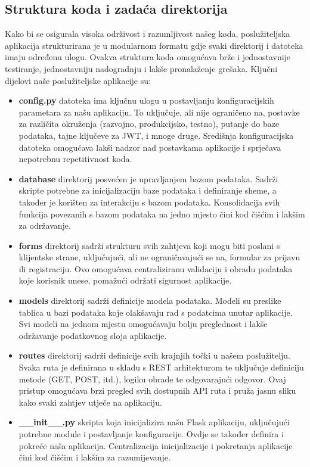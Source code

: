 \documentclass[times, utf8, zavrsni]{fer}
\begin{document}
\subsection{Struktura koda i zadaća direktorija}

Kako bi se osigurala visoka održivost i razumljivost našeg koda, poslužiteljska aplikacija strukturirana je u modularnom formatu gdje svaki direktorij i datoteka imaju određenu ulogu. Ovakva struktura koda omogućava brže i jednostavnije testiranje, jednostavniju nadogradnju i lakše pronalaženje grešaka. 
Ključni dijelovi naše poslužiteljske aplikacije su:

\begin{itemize}

\item \textbf{config.py} datoteka ima ključnu ulogu u postavljanju konfiguracijskih parametara za našu aplikaciju. To uključuje, ali nije ograničeno na, postavke za različita okruženja (razvojno, produkcijsko, testno), putanje do baze podataka, tajne ključeve za JWT, i mnoge druge. Središnja konfiguracijska datoteka omogućava lakši nadzor nad postavkama aplikacije i sprječava nepotrebnu repetitivnost koda.

\item \textbf{database} direktorij posvećen je upravljanjem bazom podataka. Sadrži skripte potrebne za inicijalizaciju baze podataka i definiranje sheme, a također je korišten za interakciju s bazom podataka. Konsolidacija svih funkcija povezanih s bazom podataka na jedno mjesto čini kod čišćim i lakšim za održavanje.

\item \textbf{forms} direktorij sadrži strukturu svih zahtjeva koji mogu biti poslani s klijentske strane, uključujući, ali ne ograničavajući se na, formular za prijavu ili registraciju. Ovo omogućava centraliziranu validaciju i obradu podataka koje korisnik unese, pomažući održati sigurnost aplikacije.

\item \textbf{models} direktorij sadrži definicije modela podataka. Modeli su preslike tablica u bazi podataka koje olakšavaju rad s podatcima unutar aplikacije. Svi modeli na jednom mjestu omogućavaju bolju preglednost i lakše održavanje podatkovnog sloja aplikacije.

\item \textbf{routes} direktorij sadrži definicije svih krajnjih točki u našem poslužitelju. Svaka ruta je definirana u skladu s REST arhitekturom te uključuje definiciju metode (GET, POST, itd.), logiku obrade te odgovarajući odgovor. Ovaj pristup omogućava brzi pregled svih dostupnih API ruta i pruža jasnu sliku kako svaki zahtjev utječe na aplikaciju.

\item \textbf{\_\_init\_\_.py} skripta koja inicijalizira našu Flask aplikaciju, uključujući potrebne module i postavljanje konfiguracije. Ovdje se također definira i pokreće naša aplikacija. Centralizacija inicijalizacije i pokretanja aplikacije čini kod čišćim i lakšim za razumijevanje.

\end{itemize}
\end{document}
